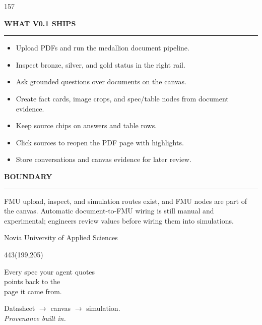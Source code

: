 \documentclass{article}
\newcommand{\panelhead}[1]{%
  \par\addvspace{5mm}%
  {\headingfont\bfseries\fontsize{14pt}{17pt}\selectfont
   \MakeUppercase{#1}\par}%
  \nopagebreak\vspace{1mm}%
  \textcolor{accent}{\rule{32mm}{1.5pt}}\par
  \vspace{1.5mm}%
}
\newcommand{\hl}[1]{\textcolor{accent}{#1}}
\newcommand{\arr}{\ensuremath{\rightarrow}}
\begin{document}
\begin{textblock}{157}
  \panelhead{What v0.1 ships}
  \begin{itemize}\setlength{\itemsep}{1.5pt}\setlength{\parsep}{1pt}\setlength{\leftmargin}{4mm}
    \item Upload PDFs and run the medallion document pipeline.
    \item Inspect bronze, silver, and gold status in the right rail.
    \item Ask grounded questions over documents on the canvas.
    \item Create fact cards, image crops, and spec/table nodes from document evidence.
    \item Keep source chips on answers and table rows.
    \item Click sources to reopen the PDF page with highlights.
    \item Store conversations and canvas evidence for later review.
  \end{itemize}

  \panelhead{Boundary}
  FMU upload, inspect, and simulation routes exist, and FMU nodes are part
  of the canvas. Automatic document-to-FMU wiring is still manual and
  experimental; engineers review values before wiring them into simulations.

  \vfill
  {\color{panelmuted}\fontsize{8.5pt}{11pt}\selectfont
   Novia University of Applied Sciences\par}
\end{textblock}


\begin{textblock}{443}(199,205)
  \color{centertext}\centering
  {\bigfont\fontsize{72pt}{86pt}\selectfont
   Every spec your agent quotes\\
   points back to the\\
   \hl{page it came from}.\par}
  \vspace{10mm}
  {\headingfont\fontsize{22pt}{28pt}\selectfont
   Datasheet \arr{} canvas \arr{} simulation.\\
   \emph{Provenance built in.}\par}
\end{textblock}
\end{document}

